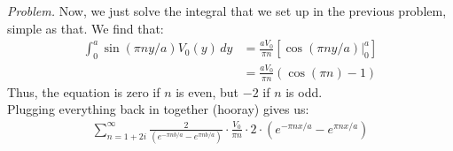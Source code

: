 \documentclass[10pt,oneside]{book}
\newcommand{\gspc}{\vspace{0.13cm}} %
\newcommand{\gline}[0]{\gspc\\} %
\newenvironment{problem}[1]
  {\vspace{-0.1cm}\begin{tcolorbox}[problembox]
   \textit{Problem. }#1}
  {\end{tcolorbox}\gspc}
\newcommand{\cpr}[1]{\left(#1\right)}
\begin{document}
\begin{itemize}
  \begin{problem}
    Now, we just solve the integral that we set up in the previous problem, simple as that. We find that:
    \begin{align*}
      \int_0^a\sin(\pi n y /a)V_0(y)\, dy &= \frac{aV_0}{\pi n}\left[\cos(\pi n y/a)\Big|_0^a\right]\\
      &= \frac{aV_0}{\pi n}\cpr{\cos(\pi n) - 1}
    \end{align*}
    Thus, the equation is zero if $n$ is even, but $-2$ if $n$ is odd. \gline{}
    Plugging everything back in together (hooray) gives us:
    \begin{align*}
      \sum_{n = 1 + 2i}^\infty\frac{2}{\cpr{e^{-\pi nb/a}-e^{\pi nb/a}}}\cdot \frac{V_0}{\pi n}\cdot 2 \cdot \cpr{e^{-\pi nx/a}-e^{\pi nx/a}}
    \end{align*}
  \end{problem}
\end{itemize}
\end{document}
